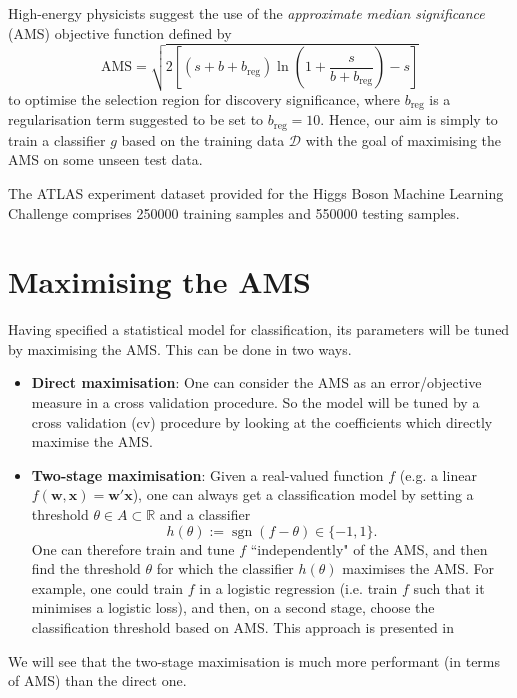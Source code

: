 \documentclass[]{article}
\begin{document}
High-energy physicists suggest the use of the \textit{approximate median significance} (AMS) objective function defined by
\begin{equation}
\label{AMS}
	\text{AMS} = \sqrt{2 \left[ (s + b + b_\text{reg}) \ln \left( 1 + \frac{s}{b + b_\text{reg}} \right) - s \right]}
\end{equation}
to optimise the selection region for discovery significance, where $b_\text{reg}$ is a regularisation term suggested to be set to $b_\text{reg}=10$. Hence, our aim is simply to train a classifier $g$ based on the training data $\mathcal{D}$ with the goal of maximising the AMS on some unseen test data.

The ATLAS experiment dataset \cite{ATLAS-dataset} provided for the Higgs Boson Machine Learning Challenge comprises 250000 training samples and 550000 testing samples.

\section{Maximising the AMS}

Having specified a statistical model for classification, its parameters will be tuned by maximising the AMS. This can be done in two ways.

\begin{itemize}
\item \textbf{Direct maximisation}: One can consider the AMS as an error/objective measure in a cross validation procedure. So the model will be tuned by a cross validation (cv) procedure by looking at the coefficients which directly maximise the AMS.

\item \textbf{Two-stage maximisation}: Given a real-valued function $f$ (e.g. a linear $f(\bm{w},\bm{x})=\bm{w}'\bm{x}$), one can always get a classification model by setting a threshold $\theta \in A\subset \mathbb{R}$ and a classifier
\begin{equation}
\label{classifier from f}
h(\theta):=\operatorname{sgn}(f-\theta)\in \{-1,1\}.
\end{equation}
One can therefore train and tune $f$ ``independently" of the AMS, and then find the threshold $\theta$ for which the classifier $h(\theta)$ maximises the AMS. For example, one could train $f$ in a logistic regression (i.e. train $f$ such that it minimises a logistic loss), and then, on a second stage, choose the classification threshold based on AMS. This approach is presented in \cite{kotlowski2014consistent}
\end{itemize}
We will see that the two-stage maximisation is much more performant (in terms of AMS) than the direct one.
\end{document}
